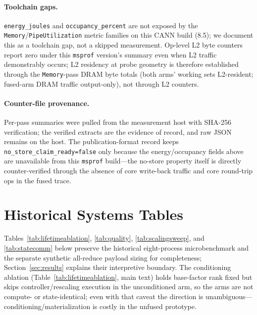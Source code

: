 \paragraph{Toolchain gaps.}
\texttt{energy\_joules} and \texttt{occupancy\_percent} are not exposed by
the \texttt{Memory}/\texttt{PipeUtilization} metric families on this CANN
build (8.5); we document this as a toolchain gap, not a skipped measurement.
Op-level L2 byte counters report zero under this \texttt{msprof} version's
summary even when L2 traffic demonstrably occurs; L2 residency at probe
geometry is therefore established through the \texttt{Memory}-pass DRAM
byte totals (both arms' working sets L2-resident; fused-arm DRAM traffic
output-only), not through L2 counters.

\paragraph{Counter-file provenance.}
Per-pass summaries were pulled from the measurement host with SHA-256
verification; the verified extracts are the evidence of record, and raw
JSON remains on the host. The publication-format record keeps
\texttt{no\_store\_claim\_ready=false} only because the energy/occupancy
fields above are unavailable from this \texttt{msprof} build---the
no-store property itself is directly counter-verified through the absence
of core write-back traffic and core round-trip ops in the fused trace.

\section{Historical Systems Tables}
\label{app:histtables}

Tables~\ref{tab:lifetimeablation}, \ref{tab:quality}, \ref{tab:scalingsweep}, and \ref{tab:statecomm} below preserve
the historical eight-process microbenchmark and the separate synthetic
all-reduce payload sizing for completeness; Section~\ref{sec:results}
explains their interpretive boundary. The conditioning ablation
(Table~\ref{tab:lifetimeablation}, main text) holds base-factor rank fixed
but skips controller/rescaling execution in the unconditioned arm, so the
arms are not compute- or state-identical; even with that caveat the
direction is unambiguous---conditioning/materialization is costly in the
unfused prototype.

